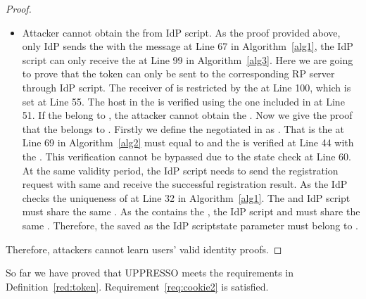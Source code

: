 \begin{appendices}
\begin{proof}
\begin{itemize}
\item Attacker cannot obtain the  from IdP script. As the proof provided above, only IdP sends the  with the message at Line 67 in Algorithm~\ref{alg1}, the IdP script can only receive the  at  Line 99 in Algorithm~\ref{alg3}. Here we are going to prove that the token  can only be  sent to the corresponding RP server through IdP script. The receiver of  is restricted by the  at Line 100, which is set at Line 55. The host in the  is verified using the one included in  at Line 51. If the  belong to , the attacker cannot obtain the . Now we give the proof that the  belongs to . Firstly we define the negotiated  in  as . That is the  at Line 69 in Algorithm~\ref{alg2}  must equal to  and the  is verified at Line 44 with the . This verification cannot be bypassed due to the state check at Line 60. At the same validity period, the IdP script needs to send the registration request with same   and receive the successful registration result. As the IdP checks the uniqueness of  at  Line 32 in Algorithm~\ref{alg1}. The  and IdP script must share the same . As the  contains the , the IdP script and  must share the same . Therefore, the   saved as the IdP scriptstate parameter must belong to .
\end{itemize}
Therefore, attackers cannot  learn users' valid identity proofs.
\end{proof}
 So far we have proved that UPPRESSO meets the requirements in Definition~\ref{red:token}. Requirement~\ref{req:cookie2} is satisfied.


\end{appendices}
